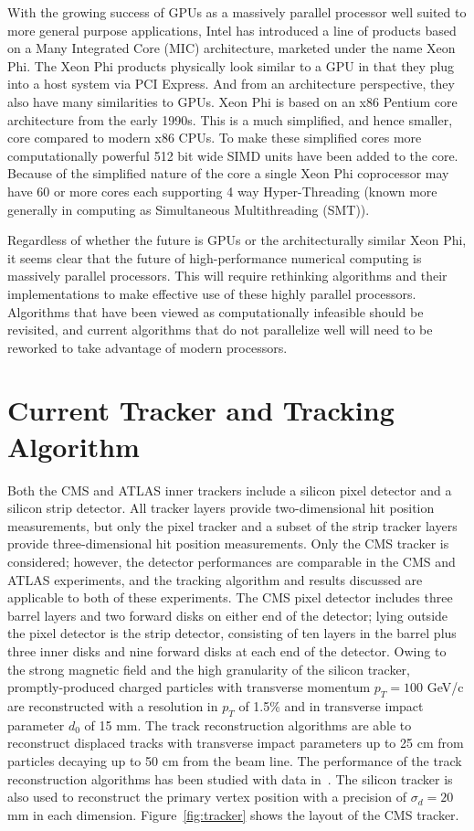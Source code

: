 \documentclass[preprint,sort&compress]{elsarticle}
\begin{document}
With the growing success of GPUs as a massively parallel processor well suited to more general purpose applications, Intel has introduced a line of products based on a Many Integrated Core (MIC) architecture, marketed under the name Xeon Phi.  The Xeon Phi products physically look similar to a GPU in that they plug into a host system via PCI Express.  And from an architecture perspective, they also have many similarities to GPUs.  Xeon Phi is based on an x86 Pentium core architecture from the early 1990s.  This is a much simplified, and hence smaller, core compared to modern x86 CPUs.  To make these simplified cores more computationally powerful 512 bit wide SIMD units have been added to the core.  Because of the simplified nature of the core a single Xeon Phi coprocessor may have 60 or more cores each supporting 4 way Hyper-Threading (known more generally in computing as Simultaneous Multithreading (SMT)).

Regardless of whether the future is GPUs or the architecturally similar Xeon Phi, it seems clear that the future of high-performance numerical computing is massively parallel processors.  This will require rethinking algorithms and their implementations to make effective use of these highly parallel processors.  Algorithms that have been viewed as computationally infeasible should be revisited, and current algorithms that do not parallelize well will need to be reworked to take advantage of modern processors.

\section{Current Tracker and Tracking Algorithm}


Both the CMS and ATLAS inner trackers include a silicon pixel detector and a silicon strip detector.
All tracker layers provide two-dimensional hit position measurements, but only the pixel tracker
 and a subset of the strip tracker layers provide three-dimensional hit position measurements.
Only the CMS tracker is considered; however, the detector performances are comparable
in the CMS and ATLAS experiments, and the tracking algorithm and results discussed are 
applicable to both of these experiments.
 The CMS pixel detector includes three barrel layers and two forward disks on either end of the
detector; lying outside the pixel detector is the strip detector, consisting of ten layers in the barrel plus
three inner disks and nine forward disks at each end of the detector. Owing to the strong magnetic field and
the high granularity of the silicon tracker, promptly-produced charged particles with transverse momentum $p_T
= 100$ GeV/c are reconstructed with a resolution in $p_T$ of 1.5\% and in transverse impact parameter $d_0$ of
15 mm. The track reconstruction algorithms are able to reconstruct displaced tracks with transverse impact
parameters up to 25 cm from particles decaying up to 50 cm from the beam line. The performance of the track
reconstruction algorithms has been studied with data in~\cite{bib:Khachatryan:2010pw}. The silicon tracker is also
used to reconstruct the primary vertex position with a precision of $\sigma_d = 20$ mm in each dimension.
Figure~\ref{fig:tracker} shows the layout of the CMS tracker.
\end{document}
